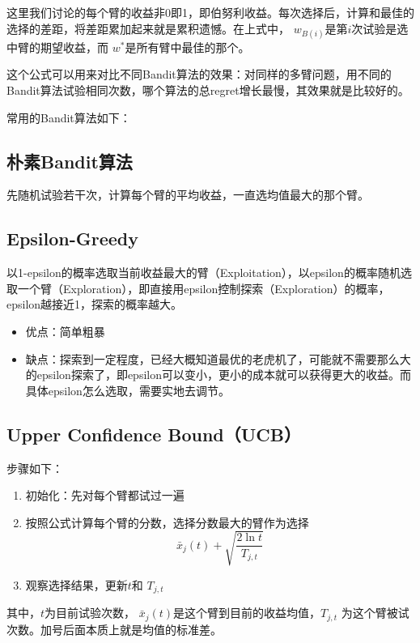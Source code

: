 \documentclass[12pt]{article}
\begin{document}
这里我们讨论的每个臂的收益非0即1，即伯努利收益。每次选择后，计算和最佳的选择的差距，将差距累加起来就是累积遗憾。在上式中， $w_{B(i)}$是第$i$次试验是选中臂的期望收益，而 $w^*$是所有臂中最佳的那个。

这个公式可以用来对比不同Bandit算法的效果：对同样的多臂问题，用不同的Bandit算法试验相同次数，哪个算法的总regret增长最慢，其效果就是比较好的。


常用的Bandit算法如下：

\subsection{朴素Bandit算法}
先随机试验若干次，计算每个臂的平均收益，一直选均值最大的那个臂。

\subsection{Epsilon-Greedy}
以1-epsilon的概率选取当前收益最大的臂（Exploitation），以epsilon的概率随机选取一个臂（Exploration），即直接用epsilon控制探索（Exploration）的概率，epsilon越接近1，探索的概率越大。
\begin{itemize}
\setlength{\itemsep}{0pt}
\setlength{\parsep}{0pt}
\setlength{\parskip}{0pt}
    \item 优点：简单粗暴
    \item 缺点：探索到一定程度，已经大概知道最优的老虎机了，可能就不需要那么大的epsilon探索了，即epsilon可以变小，更小的成本就可以获得更大的收益。而具体epsilon怎么选取，需要实地去调节。
\end{itemize}

\subsection{Upper Confidence Bound（UCB）}
步骤如下：
\begin{enumerate}
\setlength{\itemsep}{0pt}
\setlength{\parsep}{0pt}
\setlength{\parskip}{0pt}
    \item 初始化：先对每个臂都试过一遍
    \item 按照公式计算每个臂的分数，选择分数最大的臂作为选择
    $$
    	\bar{x}_j(t) + \sqrt{\frac{2\ln{t}}{T_{j,t}}}
    $$
    \item 观察选择结果，更新$t$和 $T_{j,t}$
\end{enumerate}

其中，$t$为目前试验次数，  $\bar{x}_j(t)$是这个臂到目前的收益均值，$T_{j,t}$ 为这个臂被试次数。加号后面本质上就是均值的标准差。
\end{document}
